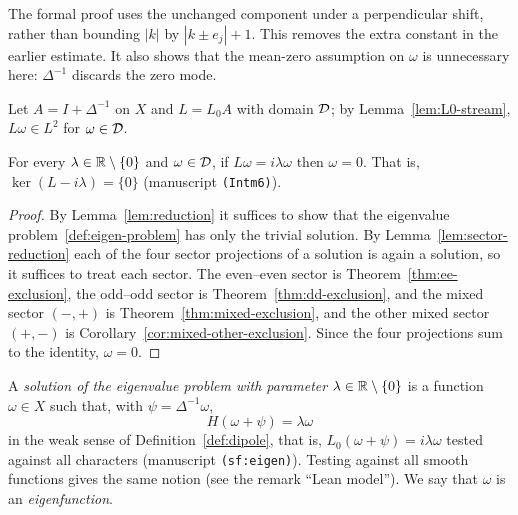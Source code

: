 \begin{remark}
The formal proof uses the unchanged component under a perpendicular shift,
rather than bounding $|k|$ by $|k\pm e_j|+1$. This removes the extra constant
in the earlier estimate. It also shows that the mean-zero assumption on
$\omega$ is unnecessary here: $\Delta^{-1}$ discards the zero mode.
\end{remark}

\begin{definition}
\label{def:linearized-operator}
\leanok
Let $A=I+\Delta^{-1}$ on $X$ and $L=L_0A$ with domain $\mathcal{D}$; by
Lemma~\ref{lem:L0-stream}, $L\omega\in L^2$ for $\omega\in\mathcal{D}$.
\end{definition}

\begin{theorem}
\label{thm:main}
\leanok
For every $\lambda\in\mathbb{R}\setminus\{0\}$ and $\omega\in\mathcal{D}$, if
$L\omega=i\lambda\omega$ then $\omega=0$. That is, $\ker(L-i\lambda)=\{0\}$
(manuscript \texttt{(Intm6)}).
\end{theorem}

\begin{proof}
\leanok
By Lemma~\ref{lem:reduction} it suffices to show that the eigenvalue
problem~\ref{def:eigen-problem} has only the trivial solution. By
Lemma~\ref{lem:sector-reduction} each of the four sector projections of a
solution is again a solution, so it suffices to treat each sector. The
even--even sector is Theorem~\ref{thm:ee-exclusion}, the odd--odd sector is
Theorem~\ref{thm:dd-exclusion}, and the mixed sector $(-,+)$ is
Theorem~\ref{thm:mixed-exclusion}, and the other mixed sector $(+,-)$ is
Corollary~\ref{cor:mixed-other-exclusion}. Since the four projections sum to
the identity, $\omega=0$.
\end{proof}

\begin{definition}
\label{def:eigen-problem}
\leanok
A \emph{solution of the eigenvalue problem with parameter
$\lambda\in\mathbb{R}\setminus\{0\}$} is a function $\omega\in X$ such that, with
$\psi=\Delta^{-1}\omega$,
\[
  H(\omega+\psi)=\lambda\omega
\]
in the weak sense of Definition~\ref{def:dipole}, that is,
$L_0(\omega+\psi)=i\lambda\omega$ tested against all characters
(manuscript \texttt{(sf:eigen)}). Testing against all smooth functions gives
the same notion (see the remark ``Lean model''). We say that
$\omega$ is an \emph{eigenfunction}.
\end{definition}

